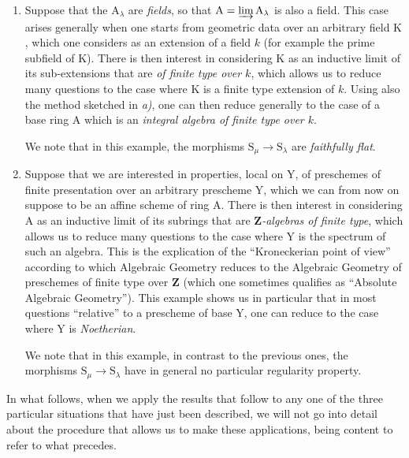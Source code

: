 \begin{env}[8.1.2]
\begin{enumerate}[label=\emph{\alph*)}]
We note that in the example considered here, the morphisms $\mathrm{S}_\mu\to\mathrm{S}_\lambda$ (for $\lambda\leqslant\mu$) are the canonical \emph{open immersions} $\mathrm{U}_\mu\hookrightarrow\mathrm{U}_\lambda$, and \emph{a fortiori} are \emph{flat} morphisms (but not faithfully flat in general), which explains the interest of the statements that appeal to such a restriction.

  \item
  Suppose that the $\mathrm{A}_\lambda$ are \emph{fields}, so that $\mathrm{A}=\varinjlim\mathrm{A}_\lambda$ is also a field.
This case arises generally when one starts from geometric data over an arbitrary field $\mathrm{K}$, which one considers as an extension of a field $k$ (for example the prime subfield of $\mathrm{K}$).
There is then interest in considering $\mathrm{K}$ as an inductive limit of its sub-extensions that are \emph{of finite type over $k$}, which allows us to reduce many questions to the case where $\mathrm{K}$ is a finite type extension of $k$.
Using also the method sketched in \emph{a)}, one can then reduce generally to the case of a base ring $\mathrm{A}$ which is an \emph{integral algebra of finite type over $k$}.

We note that in this example, the morphisms $\mathrm{S}_\mu\to\mathrm{S}_\lambda$ are \emph{faithfully flat}.

  \item
  Suppose that we are interested in properties, local on $\mathrm{Y}$, of preschemes of finite presentation over an arbitrary prescheme $\mathrm{Y}$, which we can from now on suppose to be an affine scheme of ring $\mathrm{A}$.
There is then interest in considering $\mathrm{A}$ as an inductive limit of its subrings that are \emph{$\mathbf{Z}$-algebras of finite type}, which allows us to reduce many questions to the case where $\mathrm{Y}$ is the spectrum of such an algebra.
This is the explication of the ``Kroneckerian point of view'' according to which Algebraic Geometry reduces to the
Algebraic Geometry of preschemes of finite type over $\mathbf{Z}$ (which one sometimes qualifies as ``Absolute Algebraic Geometry'').
This example shows us in particular that in most questions ``relative'' to a prescheme of base $\mathrm{Y}$, one can reduce to the case where $\mathrm{Y}$ is \emph{Noetherian}.

We note that in this example, in contrast to the previous ones, the morphisms $\mathrm{S}_\mu\to\mathrm{S}_\lambda$ have in general no particular regularity property.
\end{enumerate}

In what follows, when we apply the results that follow to any one of the three particular situations that have just been described, we will not go into detail about the procedure that allows us to make these applications, being content to refer to what precedes.
\end{env}

